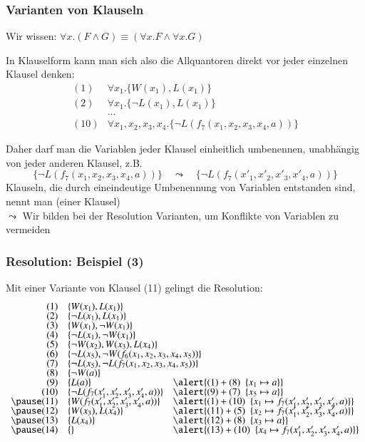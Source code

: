 \documentclass[aspectratio=1610,onlymath]{beamer}
\begin{document}
\begin{frame}\frametitle{Varianten von Klauseln}

Wir wissen: $\forall x.(F\wedge G)\equiv (\forall x.F\wedge \forall x.G)$ 
\bigskip

In Klauselform kann man sich also die Allquantoren direkt vor jeder einzelnen Klausel denken:
{\small%
\[\begin{array}{rl}
(1) & \forall x_1.\{W(x_1), L(x_1)\}\\[-0.5ex]
(2) & \forall x_1.\{\neg L(x_1), L(x_1)\}\\[-0.5ex]
& \ldots\\
(10) & \forall x_1,x_2,x_3,x_4.\{\neg L(f_7(x_1,x_2,x_3,x_4,a))\}
\end{array}
\]}\vspace{-1.5ex}\pause

Daher darf man die Variablen jeder Klausel einheitlich umbenennen, unabhängig von jeder anderen Klausel, z.B.
\[ \{\neg L(f_7(x_1,x_2,x_3,x_4,a))\} \quad\leadsto\quad \{\neg L(f_7(x'_1,x'_2,x'_3,x'_4,a))\} \]
Klauseln, die durch eineindeutige Umbenennung von Variablen entstanden sind, nennt man  (einer Klausel)\\[0.5ex]
\alert{$\leadsto$ Wir bilden bei der Resolution Varianten, um Konflikte von Variablen zu vermeiden}

\end{frame}

\begin{frame}[t]\frametitle{Resolution: Beispiel (3)}

Mit einer Variante von Klausel (11) gelingt die Resolution:
%
{\small%
\[\begin{array}{rll}
(1) & \{W(x_1), L(x_1)\}\\[-0.5ex]
(2) & \{\neg L(x_1), L(x_1)\}\\[-0.5ex]
(3) & \{W(x_1), \neg W(x_1)\}\\[-0.5ex]
(4) & \{\neg L(x_1), \neg W(x_1)\}\\[-0.5ex]
(5) & \{\neg W(x_2), W(x_3), L(x_4)\}\\[-0.5ex]
(6) & \{\neg L(x_5),\ghost{$\neg W(f_6(x_1,x_2,x_3,x_4,x_5))\}$}\\[-0.5ex]
(7) & \{\neg L(x_5),\ghost{$\neg L(f_7(x_1,x_2,x_3,x_4,x_5))\}$} \\[-0.5ex]
(8) & \{\neg W(a)\}\\[-0.5ex]
(9) & \{L(a)\} & \alert{(1)+(8)~~ \{x_1\mapsto a\}}\\[-0.5ex]
(10) & \{\neg L(f_7(x'_1,x'_2,x'_3,x'_4,a))\} & \alert{(9)+(7)~~ \{x_5\mapsto a\}}\\[-0.5ex]\pause
(11) & \{W(f_7(x'_1,x'_2,x'_3,x'_4,a))\} & \alert{(1)+(10)~~ \{x_1\mapsto f_7(x'_1,x'_2,x'_3,x'_4,a)\}}\\[-0.5ex]\pause
(12) & \{W(x_3), L(x_4)\} & \alert{(11)+(5)~~ \{x_2\mapsto f_7(x'_1,x'_2,x'_3,x'_4,a)\}}\\[-0.5ex]\pause
(13) & \{L(x_4)\} & \alert{(12)+(8)~~ \{x_3\mapsto a\}}\\[-0.5ex]\pause
(14) & \{\} & \alert{(13)+(10)~~ \{x_4\mapsto f_7(x'_1,x'_2,x'_3,x'_4,a)\}}
\end{array}
\]}

\end{frame}
\end{document}
